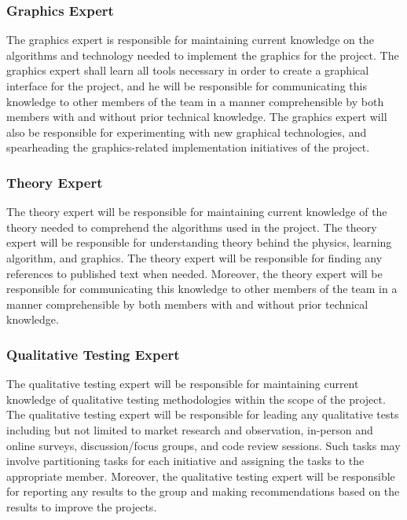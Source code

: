 \documentclass{article}
\begin{document}
\subsubsection{Graphics Expert}
The graphics expert is responsible for maintaining current knowledge on the 
algorithms and technology needed to implement the graphics for the project. The 
graphics expert shall learn all tools necessary in order to create a graphical 
interface for the project, and he will be responsible for communicating this 
knowledge to other members of the team in a manner comprehensible by both 
members with and without prior technical knowledge. The graphics expert will 
also be responsible for experimenting with new graphical technologies, and 
spearheading the graphics-related implementation initiatives of the project. 

\subsubsection{Theory Expert}
The theory expert will be responsible for maintaining current knowledge of the 
theory needed to comprehend the algorithms used in the project. The theory 
expert will be responsible for understanding theory behind the physics, learning 
algorithm, and graphics. The theory expert will be responsible for finding any 
references to published text when needed. Moreover, the theory expert will be 
responsible for communicating this knowledge to other members of the team in a 
manner comprehensible by both members with and without prior technical 
knowledge.

\subsubsection{Qualitative Testing Expert}
The qualitative testing expert will be responsible for maintaining current 
knowledge of qualitative testing methodologies within the scope of the project. 
The qualitative testing expert will be responsible for leading any qualitative 
tests including but not limited to market research and observation, in-person 
and online surveys, discussion/focus groups, and code review sessions. Such 
tasks may involve partitioning tasks for each initiative and assigning the tasks 
to the 
appropriate member. Moreover, the qualitative testing expert will be responsible 
for reporting any results to the group and making recommendations based on the 
results to improve the projects.
\end{document}
